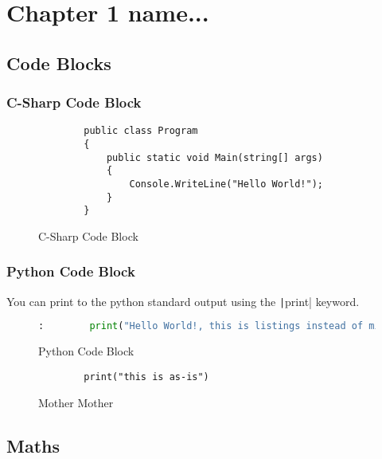 \chapter{Chapter 1 name...}


\section{Code Blocks}

\subsection{C-Sharp Code Block}

\begin{figure}[ht]
    \begin{verbatim}
        public class Program
        {
            public static void Main(string[] args)
            {
                Console.WriteLine("Hello World!");
            }
        }
    \end{verbatim}
    \caption{C-Sharp Code Block}
    \label{fig:CSharpCodeBlock}
\end{figure}

\subsection{Python Code Block}

You can print to the python standard output using the \texttt|print| keyword. 

\begin{figure}[ht]
    \centering
    \begin{lstlisting}[language=python]
:        print("Hello World!, this is listings instead of minted")
    \end{lstlisting}
    \caption{Python Code Block}
    \label{fig:PythonCodeBlock}
\end{figure}


\begin{figure}[ht]
    \centering
    \begin{Verbatim}
        print("this is as-is")
    \end{Verbatim}
    \caption{Mother Mother}
    \label{fig:berbatim}
\end{figure}

\newpage


\section{Maths}

